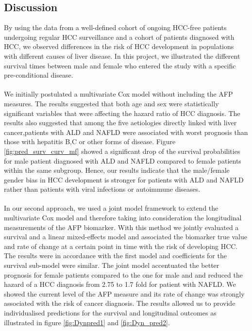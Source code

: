 \documentclass[11pt,twoside]{article}
\numberwithin{Theorem}{section}
\numberwithin{Definition}{section}
\numberwithin{Lemma}{section}
\numberwithin{Algorithm}{section}
\numberwithin{equation}{section}
\begin{document}
\subsection{Discussion}
\label{sec:Discussion}
By using the data from a well-defined cohort of ongoing HCC-free patients undergoing regular HCC surveillance and a cohort of patients diagnosed with HCC, we observed differences in the risk of HCC development in populations with different causes of liver disease. In this project, we illustrated the different survival times between male and female who entered the study with a specific pre-conditional disease. \\ \\
We initially postulated a multivariate Cox model without including the AFP measures. The results suggested that both age and sex were statistically significant variables that were affecting the hazard ratio of HCC diagnosis. The results also suggested that among the five aetiologies directly linked with liver cancer,patients with ALD and NAFLD were associated with worst prognosis than those with hepatitis B,C or other forms of disease. Figure \ref{fig:pred_surv_curv_mf} showed a significant drop of the survival probabilities for male patient diagnosed with ALD and NAFLD compared to female patients within the same subgroup. Hence, our results indicate that the male/female gender bias in HCC development is stronger for patients with ALD and NAFLD rather than patients with viral infections or autoimmune diseases. \\ \\
%
In our second approach, we used a joint model framework to extend the multivariate Cox model and therefore taking into consideration the longitudinal measurements of the AFP biomarker. With this method we jointly evaluated a survival and a linear mixed-effects model and associated the biomarker true value and rate of change at a certain point in time with the risk of developing HCC. The results were in accordance with the first model and coefficients for the survival sub-model were similar. The joint model accentuated the better prognosis for female patients compared to the one for male and and reduced the hazard of a HCC diagnosis from 2.75 to 1.7 fold for patient with NAFLD. We showed the current level of the AFP measure and its rate of change was strongly associated with the risk of cancer diagnosis. The results allowed us to provide individualised predictions for the survival and longitudinal outcomes as illustrated in figure \ref{fig:Dynpred1} and \ref{fig:Dyn_pred2}.
%
\end{document}
